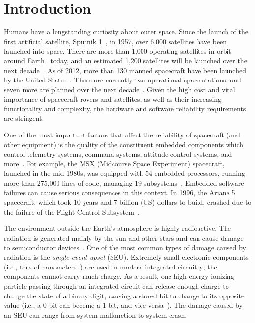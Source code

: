 \section{Introduction}\label{sec:introduction}

Humans have a longstanding curiosity about outer space. Since the launch of the first artificial satellite, Sputnik 1~\cite{sputnik1}, in 1957, over 6,000 satellites have been launched into space. There are more than 1,000 operating satellites in orbit around Earth~\cite{satellite:total} today, and an estimated 1,200 satellites will be launched over the next decade~\cite{satellite:next10years}. As of 2012, more than 130 manned spacecraft have been launched by the United States~\cite{space:shuttle:list}. There are currently two operational space stations, and seven more are planned over the next decade~\cite{space:station:tiangong2}\cite{space:station:almaz}\cite{space:station:opsek}\cite{space:station:tiangong3}. Given the high cost and vital importance of spacecraft rovers and satellites, as well as their increasing functionality and complexity, the hardware and software reliability requirements are stringent.

One of the most important factors that affect the reliability of spacecraft (and other equipment) is the quality of the constituent embedded components which control telemetry systems, command systems, attitude control systems, and more~\cite{fundamentals:space}. For example, the MSX (Midcourse Space Experiment) spacecraft, launched in the mid-1980s, was equipped with 54 embedded processors, running more than 275,000 lines of code, managing 19 subsystems~\cite{fundamentals:space}. Embedded software failures can cause serious consequences in this context. In 1996, the Ariane 5 spacecraft, which took 10 years and 7 billion (US) dollars to build, crashed due to the failure of the Flight Control Subsystem~\cite{ariane5}.

The environment outside the Earth's atmosphere is highly radioactive. The radiation is generated mainly by the sun and other stars and can cause damage to semiconductor devices~\cite{fundamentals:space}. One of the most common types of damage caused by radiation is the \textit{single event upset} (SEU). Extremely small electronic components (i.e., tens of nanometers~\cite{intel:chip:size}) are used in modern integrated circuitry; the components cannot carry much charge. As a result, one high-energy ionizing particle passing through an integrated circuit can release enough charge to change the state of a binary digit, causing a stored bit to change to its opposite value (i.e., a 0-bit can become a 1-bit, and vice-versa~\cite{fundamentals:space}). The damage caused by an SEU can range from system malfunction to system crash.

